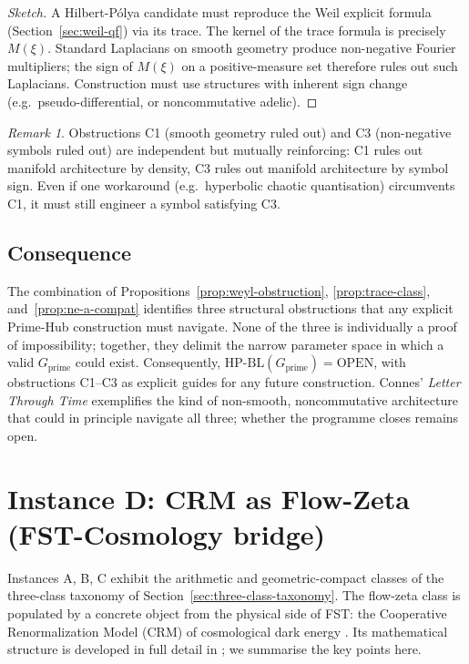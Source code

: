 \documentclass[11pt]{article}
\theoremstyle{definition}
\theoremstyle{remark}
\newtheorem{remark}[theorem]{Remark}
\newcommand{\HBL}{\mathrm{HP\text{-}BL}}
\begin{document}
\begin{proof}[Sketch]
A Hilbert-P\'olya candidate must reproduce the Weil explicit formula
(Section~\ref{sec:weil-qf}) via its trace. The kernel of the trace
formula is precisely $M(\xi)$. Standard Laplacians on smooth geometry
produce non-negative Fourier multipliers; the sign of $M(\xi)$ on a
positive-measure set therefore rules out such Laplacians.
Construction must use structures with inherent sign change (e.g.\
pseudo-differential, or noncommutative adelic).
\end{proof}

\begin{remark}\label{rem:ne-a-connection}
Obstructions C1 (smooth geometry ruled out) and C3 (non-negative
symbols ruled out) are independent but mutually reinforcing: C1
rules out manifold architecture by density, C3 rules out manifold
architecture by symbol sign. Even if one workaround (e.g.\
hyperbolic chaotic quantisation) circumvents C1, it must still
engineer a symbol satisfying C3.
\end{remark}

\subsection{Consequence}

The combination of Propositions~\ref{prop:weyl-obstruction},
\ref{prop:trace-class}, and~\ref{prop:ne-a-compat} identifies three
structural obstructions that any explicit Prime-Hub construction
must navigate. None of the three is individually a proof of
impossibility; together, they delimit the narrow parameter space in
which a valid $G_\mathrm{prime}$ could exist. Consequently,
$\HBL(G_\mathrm{prime}) = \mathrm{OPEN}$, with obstructions C1--C3
as explicit guides for any future construction. Connes'
\emph{Letter Through Time} \cite{Connes2026} exemplifies the kind of
non-smooth, noncommutative architecture that could in principle
navigate all three; whether the programme closes remains open.

\section{Instance D: CRM as Flow-Zeta (FST-Cosmology bridge)}
\label{sec:crm-flow}

Instances A, B, C exhibit the arithmetic and geometric-compact
classes of the three-class taxonomy of Section~\ref{sec:three-class-taxonomy}.
The flow-zeta class is populated by a concrete object from the
physical side of FST: the Cooperative Renormalization Model (CRM)
of cosmological dark energy \cite{RFEPFramework}. Its mathematical
structure is developed in full detail in \cite{CRMFlowZetaNote}; we
summarise the key points here.
\end{document}
